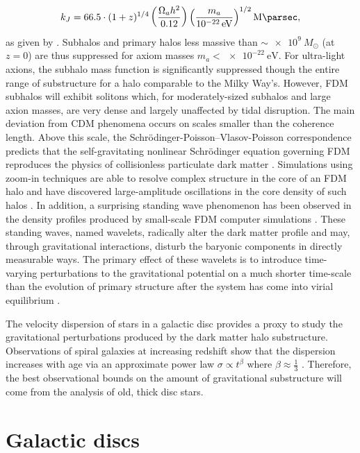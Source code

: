 \documentclass[usenatbib]{mnras}
\newcommand{\poweV}[1]{\SI{e#1}{\electronvolt}}
\begin{document}
\begin{equation}
k_J = 66.5 \cdot (1+z)^{1/4} \left( \frac{\Omega_a h^2}{0.12} \right) \left(\frac{m_a}{\poweV{-22}} \right)^{1/2} \si{\per\mega\parsec},
\end{equation}
\noindent
as given by \citet{axion_cosmology}. Subhalos and primary halos less massive than $\sim \SI{e9}{M_{\odot}}$ (at $z = 0$) are thus suppressed for axiom masses $m_a < \SI{e-22}{\electronvolt}$. For ultra-light axions, the subhalo mass function is significantly suppressed though the entire range of substructure for a halo comparable to the Milky Way’s. However, FDM subhalos will exhibit solitons which, for moderately-sized subhalos and large axion masses, are very dense and largely unaffected by tidal disruption. The main deviation from CDM phenomena occurs on scales smaller than the coherence length. Above this scale, the Schr\"{o}dinger-Poisson–Vlasov-Poisson correspondence predicts that the self-gravitating nonlinear Schr\"{o}dinger equation governing FDM reproduces the physics of collisionless particulate dark matter \citep{Schrodinger-Poisson}. Simulations using zoom-in techniques are able to resolve complex structure in the core of an FDM halo and have discovered large-amplitude oscillations in the core density of such halos \citep{structure-FDM-halos}. In addition, a surprising standing wave phenomenon has been observed in the density profiles produced by small-scale FDM computer simulations \citep{cold_and_fuzzy}. These standing waves, named wavelets, radically alter the dark matter profile and may, through gravitational interactions, disturb the baryonic components in directly measurable ways. The primary effect of these wavelets is to introduce time-varying perturbations to the gravitational potential on a much shorter time-scale than the evolution of primary structure after the system has come into virial equilibrium \citep{Schrodinger-Poisson}. 
\par
	The velocity dispersion of stars in a galactic disc provides a proxy to study the gravitational perturbations produced by the dark matter halo substructure. Observations of spiral galaxies at increasing redshift show that the dispersion increases with age via an approximate power law $\sigma \propto t^\beta$ where $\beta \approx \frac{1}{3}$ \citep{heating_history}. Therefore, the best observational bounds on the amount of gravitational substructure will come from the analysis of old, thick disc stars.  

\section{Galactic discs}
\end{document}
